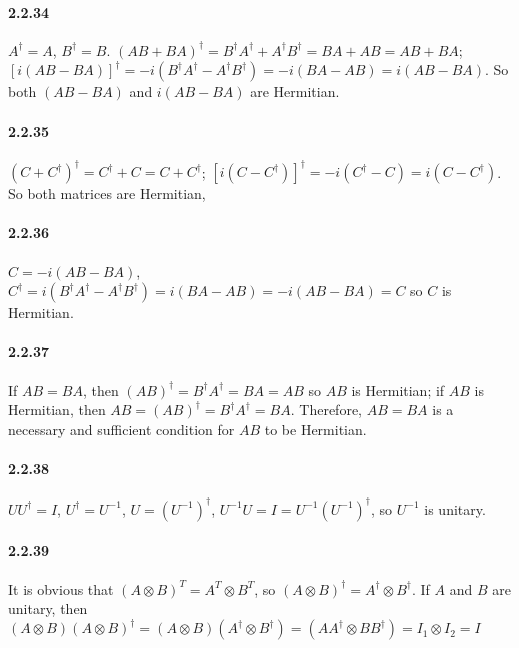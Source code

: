 \documentclass[a4paper]{article}
\begin{document}
\paragraph{2.2.34}
$A^\dagger=A$, $B^\dagger=B$. $(AB+BA)^\dagger=B^\dagger A^\dagger+A^\dagger B^\dagger=BA+AB=AB+BA$; $[i(AB-BA)]^\dagger=-i(B^\dagger A^\dagger-A^\dagger B^\dagger)=-i(BA-AB)=i(AB-BA)$. So both $(AB-BA)$ and $i(AB-BA)$ are Hermitian.

\paragraph{2.2.35}
$(C+C^\dagger)^\dagger=C^\dagger+C=C+C^\dagger$; $[i(C-C^\dagger)]^\dagger=-i(C^\dagger-C)=i(C-C^\dagger)$. So both matrices are Hermitian,

\paragraph{2.2.36}
$C=-i(AB-BA)$, $C^\dagger=i(B^\dagger A^\dagger-A^\dagger B^\dagger)=i(BA-AB)=-i(AB-BA)=C$ so $C$ is Hermitian.

\paragraph{2.2.37}
If $AB=BA$, then $(AB)^\dagger=B^\dagger A^\dagger=BA=AB$ so $AB$ is Hermitian; if $AB$ is Hermitian, then $AB=(AB)^\dagger=B^\dagger A^\dagger=BA$. Therefore, $AB=BA$ is a necessary and sufficient condition for $AB$ to be Hermitian.

\paragraph{2.2.38}
$UU^\dagger=I$, $U^\dagger=U^{-1}$, $U=(U^{-1})^\dagger$, $U^{-1}U=I=U^{-1}(U^{-1})^\dagger$, so $U^{-1}$ is unitary.

\paragraph{2.2.39}
It is obvious that $(A\otimes B)^T=A^T\otimes B^T$, so $(A\otimes B)^\dagger=A^\dagger\otimes B^\dagger$. If $A$ and $B$ are unitary, then $(A\otimes B)(A\otimes B)^\dagger =(A\otimes B)(A^\dagger\otimes B^\dagger)=(AA^\dagger\otimes BB^\dagger)=I_1\otimes I_2=I$
\end{document}
